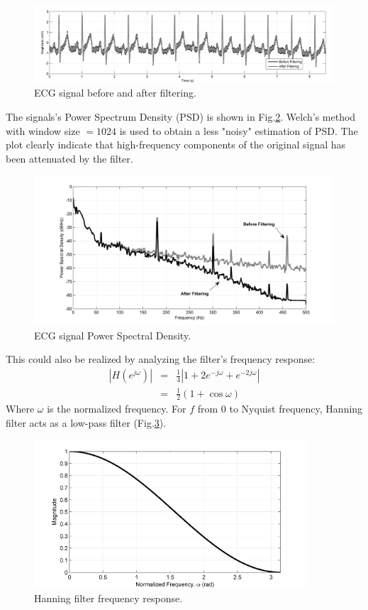 \documentclass[11pt]{article}
\begin{document}
\begin{figure}[H]
	\centering
	\includegraphics[width=7in]{Fig_ECG_Waveform.png}
	\caption{ECG signal before and after filtering.}
	\label{Fig_ECG_Waveform}
\end{figure}

The signals's Power Spectrum Density (PSD) is shown in Fig.\ref{Fig_ECG_PSD}. Welch's method with window size $=1024$ is used to obtain a less "noisy" estimation of PSD. The plot clearly indicate that high-frequency components of the original signal has been attenuated by the filter. 

\begin{figure}[H]
	\centering
	\includegraphics[trim=0.5in 0.3in 0.5in 0in, width=5in]{Fig_ECG_PSD.png}
	\caption{ECG signal Power Spectral Density.}
	\label{Fig_ECG_PSD}
\end{figure}

This could also be realized by analyzing the filter's frequency response:
\begin{eqnarray*}
|H(e^{j\omega})| &=& \frac{1}{4}|1 + 2e^{-j\omega} + e^{-2j\omega}| \\
&=& \frac{1}{2}(1 + \cos \omega)
\end{eqnarray*}
Where $\omega$ is the normalized frequency. For $f$ from 0 to Nyquist frequency, Hanning filter acts as a low-pass filter (Fig.\ref{Fig_HannFreqResponse}).

\begin{figure}[H]
	\centering
	\includegraphics[trim=0.5in 0in 0.5in 0in, width=4in]{Fig_HannFreqResponse.png}
	\caption{Hanning filter frequency response.}
	\label{Fig_HannFreqResponse}
\end{figure}
\end{document}

